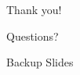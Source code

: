 \documentclass{beamer}
\begin{document}


\begin{frame}[noframenumbering]{Thank you!}
    \begin{center}
        Questions?
    \end{center}
\end{frame}

\begin{frame}[noframenumbering]
    \begin{center}
        Backup Slides
    \end{center}
\end{frame}
\end{document}
